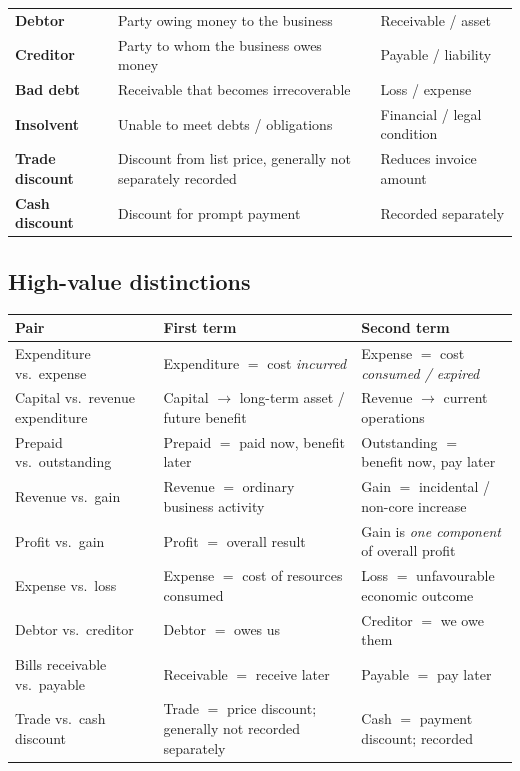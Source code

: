 \documentclass[11pt,a4paper]{article}
\begin{document}
\begin{center}
\begin{tabularx}{\textwidth}{@{}l Y l@{}}
\textbf{Debtor} & Party owing money to the business & Receivable / asset\\
\textbf{Creditor} & Party to whom the business owes money & Payable / liability\\
\textbf{Bad debt} & Receivable that becomes irrecoverable & Loss / expense\\
\textbf{Insolvent} & Unable to meet debts / obligations & Financial / legal condition\\
\textbf{Trade discount} & Discount from list price, generally not separately recorded & Reduces invoice amount\\
\textbf{Cash discount} & Discount for prompt payment & Recorded separately\\
\bottomrule
\end{tabularx}
\end{center}

\subsection{High-value distinctions}

\begin{center}
\small
\begin{tabularx}{\textwidth}{@{}l Y Y@{}}
\toprule
{}\textbf{Pair} & \textbf{First term} & \textbf{Second term}\\
\midrule
Expenditure vs.\ expense & Expenditure $=$ cost \emph{incurred} & Expense $=$ cost \emph{consumed / expired}\\
Capital vs.\ revenue expenditure & Capital $\rightarrow$ long-term asset / future benefit & Revenue $\rightarrow$ current operations\\
Prepaid vs.\ outstanding & Prepaid $=$ paid now, benefit later & Outstanding $=$ benefit now, pay later\\
Revenue vs.\ gain & Revenue $=$ ordinary business activity & Gain $=$ incidental / non-core increase\\
Profit vs.\ gain & Profit $=$ overall result & Gain is \emph{one component} of overall profit\\
Expense vs.\ loss & Expense $=$ cost of resources consumed & Loss $=$ unfavourable economic outcome\\
Debtor vs.\ creditor & Debtor $=$ owes us & Creditor $=$ we owe them\\
Bills receivable vs.\ payable & Receivable $=$ receive later & Payable $=$ pay later\\
Trade vs.\ cash discount & Trade $=$ price discount; generally not recorded separately & Cash $=$ payment discount; recorded\\
\bottomrule
\end{tabularx}
\end{center}
\end{document}
